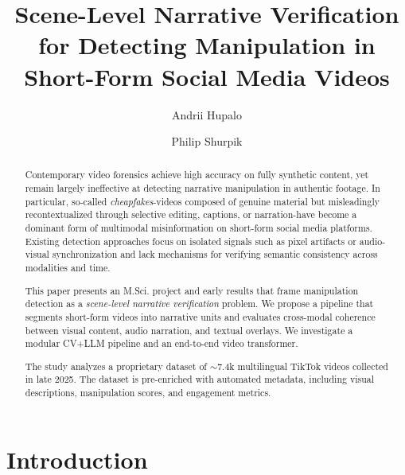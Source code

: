 \documentclass[runningheads]{llncs}
\begin{document}
%
\title{Scene-Level Narrative Verification for Detecting Manipulation in Short-Form Social Media Videos}
%
%
\author{Andrii Hupalo \and
Philip Shurpik}
%
%
%
\maketitle              %
%
\begin{abstract}
Contemporary video forensics achieve high accuracy on fully synthetic content, yet remain largely ineffective at detecting narrative manipulation in authentic footage. In particular, so-called \emph{cheapfakes}-videos composed of genuine material but misleadingly recontextualized through selective editing, captions, or narration-have become a dominant form of multimodal misinformation on short-form social media platforms. Existing detection approaches focus on isolated signals such as pixel artifacts or audio-visual synchronization and lack mechanisms for verifying semantic consistency across modalities and time.

This paper presents an M.Sci. project and early results that frame manipulation detection as a \emph{scene-level narrative verification} problem. We propose a pipeline that segments short-form videos into narrative units and evaluates cross-modal coherence between visual content, audio narration, and textual overlays. We investigate a modular CV+LLM pipeline and an end-to-end video transformer.

The study analyzes a proprietary dataset of $\sim$7.4k multilingual TikTok videos collected in late 2025. The dataset is pre-enriched with automated metadata, including visual descriptions, manipulation scores, and engagement metrics.

\end{abstract}

%
\section{Introduction}
\end{document}
